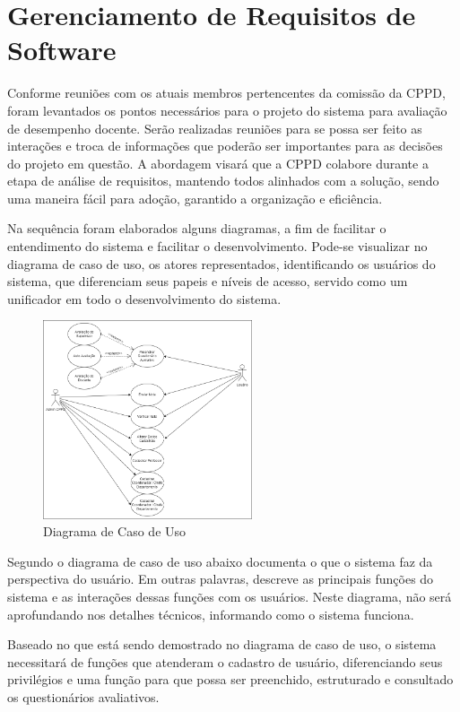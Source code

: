 \section{Gerenciamento de Requisitos de Software}
  
    Conforme reuniões com os atuais membros pertencentes da comissão da CPPD, foram levantados os pontos necessários para o projeto do sistema para avaliação de desempenho docente. Serão realizadas reuniões para se possa ser feito as interações e troca de informações que poderão ser importantes para as decisões do projeto em questão. A abordagem visará que a CPPD colabore durante a etapa de análise de requisitos, mantendo todos alinhados com a solução, sendo uma maneira fácil para adoção, garantido a organização e eficiência.
    
    Na sequência foram elaborados alguns diagramas, a fim de facilitar o entendimento do sistema e facilitar o desenvolvimento. Pode-se visualizar no diagrama de caso de uso, os atores representados, identificando os usuários do sistema, que diferenciam seus papeis e níveis de acesso, servido como um unificador em todo o desenvolvimento do sistema.
    
    
    \begin{figure}[h]
    \centering
    \includegraphics[width=0.55\textwidth]{./img/CasoUso.png}
    \caption{Diagrama de Caso de Uso}
    \label{fig:CasoUso}
    \end{figure}
    
    Segundo  o diagrama de caso de uso abaixo documenta o que o sistema faz da perspectiva do usuário. Em outras palavras, descreve as principais funções do sistema e as interações dessas funções com os usuários. Neste diagrama, não será aprofundando nos detalhes técnicos, informando como o sistema funciona.
    
    Baseado no que está sendo demostrado no diagrama de caso de uso, o sistema necessitará de funções que atenderam o cadastro de usuário, diferenciando seus privilégios e uma função para que possa ser preenchido, estruturado e consultado os questionários avaliativos.
    
